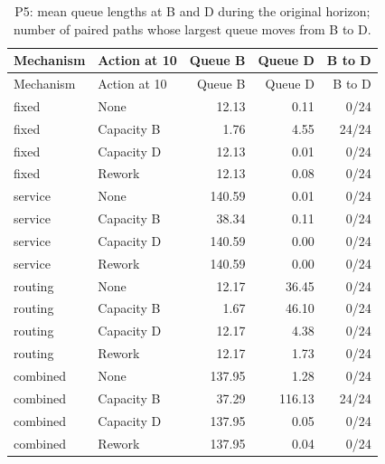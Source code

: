 \begin{longtable}{llrrr}\caption{P5: mean queue lengths at B and D during the original horizon; number of paired paths whose largest queue moves from B to D.}\\\toprule

Mechanism & Action at 10 & Queue B & Queue D & B to D\\\midrule\endfirsthead

\toprule Mechanism & Action at 10 & Queue B & Queue D & B to D\\\midrule\endhead

fixed & None & 12.13 & 0.11 & 0/24\\

fixed & Capacity B & 1.76 & 4.55 & 24/24\\

fixed & Capacity D & 12.13 & 0.01 & 0/24\\

fixed & Rework & 12.13 & 0.08 & 0/24\\

service & None & 140.59 & 0.01 & 0/24\\

service & Capacity B & 38.34 & 0.11 & 0/24\\

service & Capacity D & 140.59 & 0.00 & 0/24\\

service & Rework & 140.59 & 0.00 & 0/24\\

routing & None & 12.17 & 36.45 & 0/24\\

routing & Capacity B & 1.67 & 46.10 & 0/24\\

routing & Capacity D & 12.17 & 4.38 & 0/24\\

routing & Rework & 12.17 & 1.73 & 0/24\\

combined & None & 137.95 & 1.28 & 0/24\\

combined & Capacity B & 37.29 & 116.13 & 24/24\\

combined & Capacity D & 137.95 & 0.05 & 0/24\\

combined & Rework & 137.95 & 0.04 & 0/24\\

\bottomrule\end{longtable}
